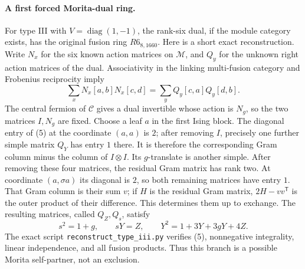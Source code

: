 \documentclass[11pt]{article}
\newcommand{\C}{\mathcal C}\newcommand{\I}{\mathcal I}\newcommand{\M}{\mathcal M}
\begin{document}
\paragraph{A first forced Morita-dual ring.}
For type III with $V=\operatorname{diag}(1,-1)$, the rank-six dual,
if the module category exists, has the original fusion ring
$R6_{8,1660}$. Here is a short exact reconstruction.
Write $N_x$ for the six known action matrices on $\M$, and $Q_y$ for
the unknown right action matrices of the dual. Associativity in the
linking multi-fusion category and Frobenius reciprocity imply
\[
\sum_x N_x[a,b]N_x[c,d]
 =\sum_y Q_y[c,a]Q_y[d,b]. \tag{5}
\]
The central fermion of $\C$ gives a dual invertible whose action is
$N_g$, so the two matrices $I,N_g$ are fixed. Choose a leaf $a$ in the
first Ising block. The diagonal entry of (5) at the coordinate $(a,a)$
is $2$; after removing $I$, precisely one further simple matrix $Q_Y$
has entry $1$ there. It is therefore the corresponding Gram column
minus the column of $I\otimes I$. Its $g$-translate is another simple.
After removing these four matrices, the residual Gram matrix has rank
two. At coordinate $(a,\sigma a)$ its diagonal is $2$, so both remaining
matrices have entry $1$. That Gram column is their sum $v$; if $H$ is
the residual Gram matrix, $2H-vv^{\mathsf T}$ is the outer product of
their difference. This determines them up to exchange.
The resulting matrices, called $Q_Z,Q_s$, satisfy
\[
s^2=1+g,\qquad sY=Z,\qquad
Y^2=1+3Y+3gY+4Z.
\]
The exact script \texttt{reconstruct\_type\_iii.py} verifies (5),
nonnegative integrality, linear independence, and all fusion products.
Thus this branch is a possible Morita self-partner, not an exclusion.
\end{document}
